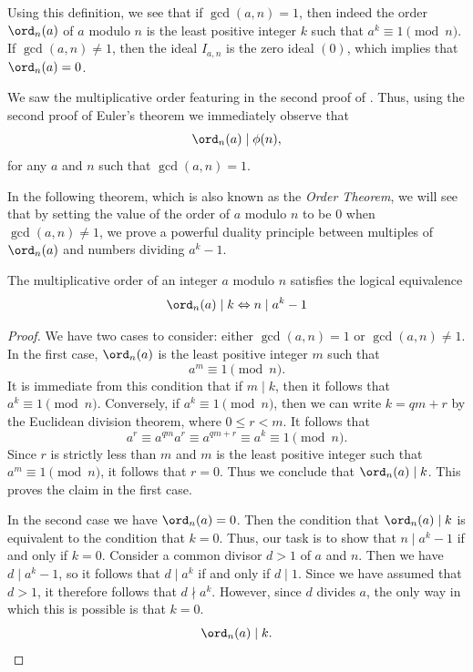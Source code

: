 Using this definition, we see that if $\gcd(a,n)=1$, then indeed the order $\ord_n(a)$ of $a$ modulo $n$ is the least positive integer $k$ such that $a^k\equiv 1\pmod{n}$. If $\gcd(a,n)\neq 1$, then the ideal $I_{a,n}$ is the zero ideal $(0)$, which implies that $\ord_n(a)=0$.

We saw the multiplicative order featuring in the second proof of . Thus, using the second proof of Euler's theorem we immediately observe that
\begin{equation*}
  \ord_n(a)\mid \phi(n),
\end{equation*}
for any $a$ and $n$ such that $\gcd(a,n)=1$.

In the following theorem, which is also known as the \emph{Order Theorem}, we will see that by setting the value of the order of $a$ modulo $n$ to be $0$ when $\gcd(a,n)\neq 1$, we prove a powerful duality principle between multiples of $\ord_n(a)$ and numbers dividing $a^k-1$.

\begin{theorem}\label{theorem:order-theorem}
  The multiplicative order of an integer $a$ modulo $n$ satisfies the logical equivalence
  \begin{equation*}
    \ord_n(a)\mid k \Leftrightarrow n \mid a^k-1
  \end{equation*}
\end{theorem}

\begin{proof}
  We have two cases to consider: either $\gcd(a,n)=1$ or $\gcd(a,n)\neq 1$. In the first case, $\ord_n(a)$ is the least positive integer $m$ such that
  \begin{equation*}
    a^m\equiv 1 \pmod{n}.
  \end{equation*}
  It is immediate from this condition that if $m\mid k$, then it follows that $a^k\equiv 1\pmod{n}$. Conversely, if $a^k\equiv 1\pmod{n}$, then we can write $k=qm+r$ by the Euclidean division theorem, where $0\leq r<m$. It follows that
  \begin{equation*}
    a^r \equiv a^{qm}a^r \equiv a^{qm+r} \equiv a^k \equiv 1\pmod{n}. 
  \end{equation*}
  Since $r$ is strictly less than $m$ and $m$ is the least positive integer such that $a^m\equiv 1\pmod{n}$, it follows that $r=0$. Thus we conclude that $\ord_n(a)\mid k$. This proves the claim in the first case.

  In the second case we have $\ord_n(a)=0$. Then the condition that $\ord_n(a)\mid k$ is equivalent to the condition that $k=0$. Thus, our task is to show that $n\mid a^k-1$ if and only if $k=0$. Consider a common divisor $d>1$ of $a$ and $n$. Then we have $d\mid a^k-1$, so it follows that $d\mid a^k$ if and only if $d\mid 1$. Since we have assumed that $d>1$, it therefore follows that $d\nmid a^k$. However, since $d$ divides $a$, the only way in which this is possible is that $k=0$.
  \begin{equation*}
    \ord_n(a)\mid k.\qedhere
  \end{equation*}
\end{proof}


